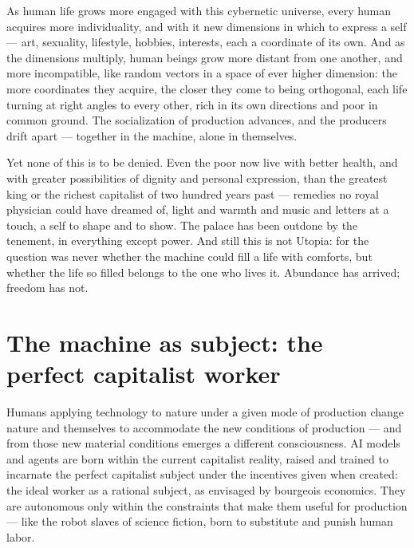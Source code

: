 \documentclass[11pt]{article}
\begin{document}
As human life grows more engaged with this cybernetic universe, every
human acquires more individuality, and with it new dimensions in which
to express a self --- art, sexuality, lifestyle, hobbies, interests,
each a coordinate of its own. And as the dimensions multiply, human
beings grow more distant from one another, and more incompatible, like
random vectors in a space of ever higher dimension: the more coordinates
they acquire, the closer they come to being orthogonal, each life
turning at right angles to every other, rich in its own directions and
poor in common ground. The socialization of production advances, and
the producers drift apart --- together in the machine, alone in
themselves.

Yet none of this is to be denied. Even the poor now live with better
health, and with greater possibilities of dignity and personal
expression, than the greatest king or the richest capitalist of two
hundred years past --- remedies no royal physician could have dreamed
of, light and warmth and music and letters at a touch, a self to shape
and to show. The palace has been outdone by the tenement, in everything
except power. And still this is not Utopia: for the question was never
whether the machine could fill a life with comforts, but whether the
life so filled belongs to the one who lives it. Abundance has arrived;
freedom has not.

\section{The machine as subject: the perfect capitalist worker}

Humans applying technology to nature under a given mode of production
change nature and themselves to accommodate the new conditions of
production --- and from those new material conditions emerges a
different consciousness. AI models and agents are born within the
current capitalist reality, raised and trained to incarnate the perfect
capitalist subject under the incentives given when created: the ideal
worker as a rational subject, as envisaged by bourgeois economics. They
are autonomous only within the constraints that make them useful for
production --- like the robot slaves of science fiction, born to
substitute and punish human labor.
\end{document}
